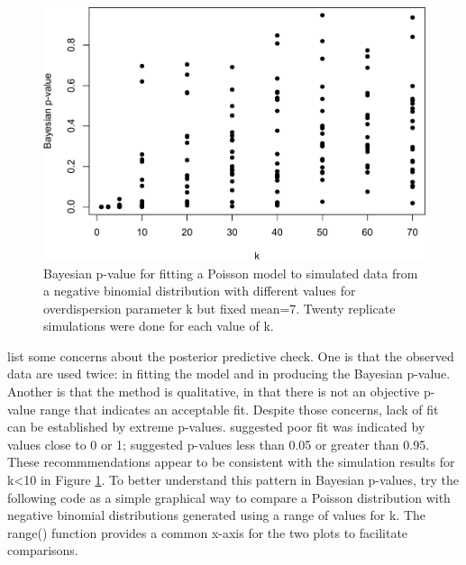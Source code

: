 \documentclass[
]{krantz}
\begin{document}
\begin{figure}
\includegraphics[width=0.9\linewidth]{bookdown_files/figure-latex/PPC-1} \caption{Bayesian p-value for fitting a Poisson model to simulated data from a negative binomial distribution with different values for overdispersion parameter k but fixed mean=7. Twenty replicate simulations were done for each value of k.}\label{fig:PPC}
\end{figure}

\citet{kéry.schaub_2012} list some concerns about the posterior predictive check. One is that the observed data are used twice: in fitting the model and in producing the Bayesian p-value. Another is that the method is qualitative, in that there is not an objective p-value range that indicates an acceptable fit. Despite those concerns, lack of fit can be established by extreme p-values. \citet{kéry_2010} suggested poor fit was indicated by values close to 0 or 1; \citet{conn.etal_2018} suggested p-values less than 0.05 or greater than 0.95. These recommmendations appear to be consistent with the simulation results for k\textless10 in Figure \ref{fig:PPC}. To better understand this pattern in Bayesian p-values, try the following code as a simple graphical way to compare a Poisson distribution with negative binomial distributions generated using a range of values for k. The range() function provides a common x-axis for the two plots to facilitate comparisons.
\end{document}
